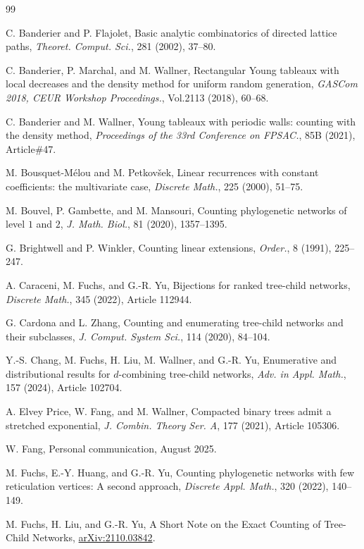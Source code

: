 \documentclass[reqno, 12pt]{article}
\theoremstyle{mydefinition}
\theoremstyle{myremark}
\numberwithin{algorithm}{section}
\begin{document}
\begin{thebibliography}{99}

 C. Banderier and P. Flajolet, Basic analytic combinatorics of directed lattice paths, \emph{Theoret. Comput. Sci.}, 281 (2002), 37--80.

 C. Banderier, P. Marchal, and M. Wallner, Rectangular Young tableaux with local decreases and the density method for uniform random generation, \emph{GASCom 2018, CEUR Workshop Proceedings.}, Vol.2113 (2018), 60--68.

 C. Banderier and M. Wallner, Young tableaux with periodic walls: counting with the density method, \emph{Proceedings of the 33rd Conference on FPSAC.}, 85B (2021), Article\#47.

 M. Bousquet-M\'elou and M. Petkov\v{s}ek, Linear recurrences with constant coefficients: the multivariate case, \emph{Discrete Math.}, 225 (2000), 51--75.

M. Bouvel,  P. Gambette, and M. Mansouri,  Counting phylogenetic networks of level $1$ and $2$, \emph{J. Math. Biol.}, 81 (2020), 1357--1395.

 G. Brightwell and P. Winkler, Counting linear extensions, \emph{Order.}, 8 (1991), 225--247.

 A. Caraceni, M. Fuchs, and G.-R. Yu, Bijections for ranked tree-child networks, \emph{Discrete Math.}, 345 (2022), Article  112944.

 G. Cardona and L. Zhang, Counting and enumerating tree-child networks and their subclasses, \emph{J. Comput. System Sci.}, 114 (2020), 84--104.

 Y.-S. Chang, M. Fuchs, H. Liu, M. Wallner, and G.-R. Yu, Enumerative and distributional results for $d$-combining tree-child networks, \emph{Adv. in Appl. Math.}, 157 (2024), Article 102704.

 A. Elvey Price, W. Fang, and M. Wallner, Compacted binary trees admit a stretched exponential, \emph{J. Combin. Theory Ser. A}, 177 (2021), Article 105306.

 W. Fang, Personal communication, August  2025.


 M. Fuchs, E.-Y. Huang, and  G.-R. Yu, Counting phylogenetic networks with few reticulation vertices: A second approach, \emph{Discrete Appl. Math.}, 320 (2022), 140--149.

 M. Fuchs, H. Liu, and G.-R. Yu, A Short Note on the Exact Counting of Tree-Child Networks, \href{https://arxiv.org/abs/2110.03842}{arXiv:2110.03842}.


\end{thebibliography}
\end{document}
